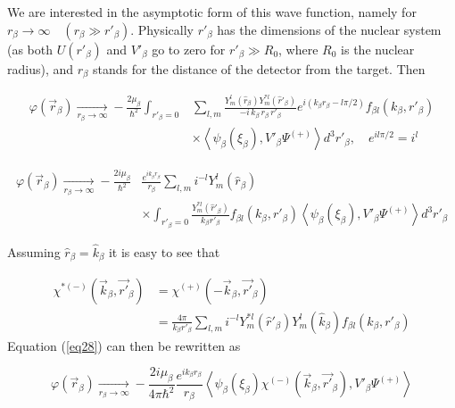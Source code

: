 \documentclass[a4paper,14pt]{book}
\begin{document}
We are interested in the asymptotic form of this wave function, namely for $r_\beta \longrightarrow \infty \quad (r_\beta \gg r'_\beta)$. Physically $r'_\beta$ has the dimensions of the nuclear system (as both $ U(r'_\beta)$ and $V'_\beta$ go to zero for $r'_\beta \gg R_0$, where $R_0$ is the nuclear radius), and $r_\beta$ stands for the distance of the detector from the target. Then




\begin{equation}\label{eq27}
\begin{split}
\varphi(\vec r_{\beta}) \xrightarrow[r_\beta \rightarrow \infty]{} -\frac{2 \mu_{\beta}}{\hbar^2} \int_{r'_{\beta}=0} &
\sum_{l,m}  \frac{Y_m^l(\hat r_ \beta)Y_m^{*l}(\hat r'_ \beta)}{-i \, k_\beta \, r_ \beta\, r'_ \beta}
e^{i(k_\beta r_ \beta-l\pi/2)}f_{\beta l}(k_\beta, r'_ \beta) \\
& \times \left\langle
\psi_\beta (\xi_\beta),V'_\beta \Psi^{(+)}\right\rangle d^3 r'_ \beta,\quad e^{i l\pi/2}=i^l
\end{split}
\end{equation}


\begin{equation}\label{eq28}
\begin{split}
\varphi(\vec r_{\beta}) \xrightarrow[r_\beta \rightarrow \infty]{} -\frac{2i \mu_{\beta}}{\hbar^2} &
\frac{e^{i k_\beta r_\beta}}{r_\beta} \sum_{l,m} i^{-l} Y_m^l(\hat r_ \beta)\\
& \times \int_{r'_{\beta}=0}
\frac{Y_m^{*l}(\hat r'_ \beta)}{k_\beta r'_\beta} f_{\beta l}(k_\beta, r'_ \beta) \left\langle
\psi_\beta (\xi_\beta),V'_\beta \Psi^{(+)}\right\rangle d^3 r'_ \beta
\end{split}
\end{equation}

Assuming $\hat r_ \beta=\hat k_ \beta$ it is easy to see that

\begin{equation}\label{eq29}
\begin{split}
\chi^{*(-)}(\vec k_\beta, \vec {r'}_\beta)& = \chi^{(+)}(-\vec k_\beta,\vec {r'}_\beta)\\
&=\frac{4\pi}{k_\beta r'_\beta}\sum_{l,m} i^{-l} Y_m^{*l}(\hat r'_ \beta)Y_m^l(\hat k_ \beta) f_{\beta l}(k_\beta, r'_ \beta)
\end{split}
\end{equation}
Equation (\ref{eq28}) can then be rewritten as

\begin{equation}\label{eq30}
\varphi(\vec r_{\beta}) \xrightarrow[r_\beta \rightarrow \infty]{} -\frac{2i \mu_{\beta}}{4\pi\hbar^2} \frac{e^{i k_\beta r_\beta}}{r_\beta} \left\langle
\psi_\beta (\xi_\beta)\chi^{(-)}(\vec k_\beta, \vec {r'}_\beta),V'_\beta \Psi^{(+)}\right\rangle
\end{equation}
\end{document}
